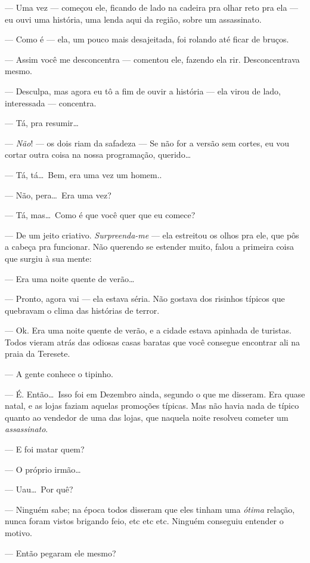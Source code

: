 --- Uma vez --- começou ele, ficando de lado na cadeira pra olhar reto pra ela --- eu ouvi uma história, uma lenda aqui da região, sobre um assassinato.

--- Como é --- ela, um pouco mais desajeitada, foi rolando até ficar de bruços.

--- Assim você me desconcentra --- comentou ele, fazendo ela rir. Desconcentrava mesmo.

--- Desculpa, mas agora eu tô a fim de ouvir a história --- ela virou de lado, interessada --- concentra.

--- Tá, pra resumir\ldots

--- \emph{Não}! --- os dois riam da safadeza --- Se não for a versão sem cortes, eu vou cortar outra coisa na nossa programação, querido\ldots

--- Tá, tá\ldots \ Bem, era uma vez um homem..

--- Não, pera\ldots \ Era uma vez?

--- Tá, mas\ldots \ Como é que você quer que eu comece?

--- De um jeito criativo. \emph{Surpreenda-me} --- ela estreitou os olhos pra ele, que pôs a cabeça pra funcionar. Não querendo se estender muito, falou a primeira coisa que surgiu à sua mente:

--- Era uma noite quente de verão\ldots 

--- Pronto, agora vai --- ela estava séria. Não gostava dos risinhos típicos que quebravam o clima das histórias de terror.

--- Ok. Era uma noite quente de verão, e a cidade estava apinhada de turistas. Todos vieram atrás das odiosas casas baratas que você consegue encontrar ali na praia da Teresete.

--- A gente conhece o tipinho.

--- É. Então\ldots \ Isso foi em Dezembro ainda, segundo o que me disseram. Era quase natal, e as lojas faziam aquelas promoções típicas. Mas não havia nada de típico quanto ao vendedor de uma das lojas, que naquela noite resolveu cometer um \emph{assassinato}.

--- E foi matar quem?

--- O próprio irmão\ldots

--- Uau\ldots \ Por quê?

--- Ninguém sabe; na época todos disseram que eles tinham uma \emph{ótima} relação, nunca foram vistos brigando feio, etc etc etc. Ninguém conseguiu entender o motivo.

--- Então pegaram ele mesmo?


